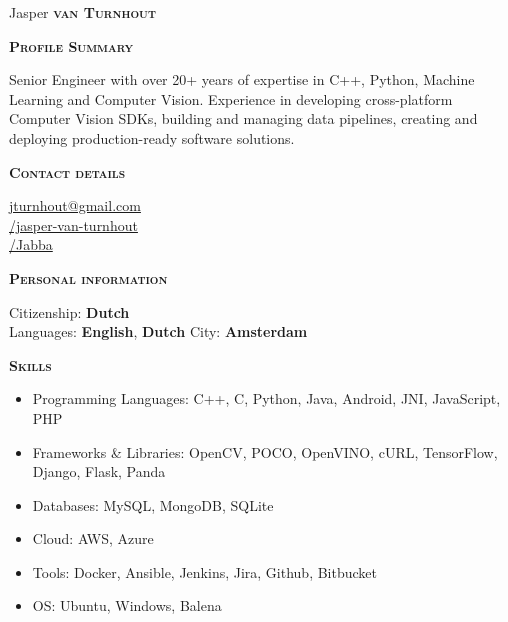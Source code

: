 \documentclass[11pt, a4paper]{article}
\newcommand{\headleft}[1]{\vspace*{3ex}\textsc{\textbf{#1}}\par%
    \vspace*{-1.5ex}\hrulefill\par\vspace*{0.7ex}}
\begin{document}
\setlength{\topskip}{0pt}
\setlength{\parindent}{0pt}
\setlength{\parskip}{0pt}
\setlength{\fboxsep}{0pt}
\pagestyle{empty}
\raggedbottom

\begin{minipage}[t]{0.33\textwidth} %
\colorbox{cvblue1!80}{\begin{minipage}[t][5mm][t]{\textwidth}\null\hfill\null\end{minipage}}

\vspace{-.2ex} %
\colorbox{cvblue2}{\color{white}  %
\textwidth\relax%
\begin{minipage}[t][293mm][t]{0.82\textwidth}
\raggedright
\vspace*{2.5ex}

\Large Jasper \textbf{\textsc{van Turnhout}} \normalsize 

\vspace*{0.5ex} %

\headleft{Profile Summary}
Senior Engineer with over 20+ years of expertise in C++, Python, Machine Learning and Computer Vision. Experience in developing cross-platform Computer Vision SDKs, building and managing data pipelines, creating and deploying production-ready software solutions.

\headleft{Contact details}
\small %
 \href{mailto:jturnhout@gmail.com}{jturnhout@gmail.com}\\
 \href{https://linkedin.com/in/jasper-van-turnhout/}{/jasper-van-turnhout}\\
 \href{https://github.com/Jabba}{/Jabba}
\normalsize

\headleft{Personal information}
\small Citizenship: \textbf{Dutch} \\[0.5ex]
\small Languages: \textbf{English}, \textbf{Dutch}
\small City: \textbf{Amsterdam}
\normalsize

\headleft{Skills}
\begin{itemize}
\item Programming Languages: C++, C, Python, Java, Android, JNI, JavaScript, PHP
\item Frameworks \& Libraries: OpenCV, POCO, OpenVINO, cURL, TensorFlow, Django, Flask, Panda
\item Databases: MySQL, MongoDB, SQLite
\item Cloud: AWS, Azure
\item Tools: Docker, Ansible, Jenkins, Jira, Github, Bitbucket
\item OS: Ubuntu, Windows, Balena
\end{itemize} 

\end{minipage}%
\textwidth\relax%
}
\end{minipage}%
\end{document}
